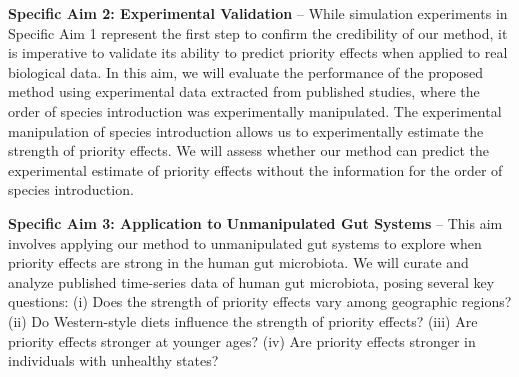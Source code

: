 \documentclass[12pt, class=article, crop=false]{standalone}
\begin{document}
\textbf{Specific Aim 2: Experimental Validation} --
While simulation experiments in Specific Aim 1 represent the first step to confirm the credibility of our method, it is imperative to validate its ability to predict priority effects when applied to real biological data.
In this aim, we will evaluate the performance of the proposed method using experimental data extracted from published studies, where the order of species introduction was experimentally manipulated.
The experimental manipulation of species introduction allows us to experimentally estimate the strength of priority effects.
We will assess whether our method can predict the experimental estimate of priority effects without the information for the order of species introduction.

\textbf{Specific Aim 3: Application to Unmanipulated Gut Systems} --
This aim involves applying our method to unmanipulated gut systems to explore when priority effects are strong in the human gut microbiota.
We will curate and analyze published time-series data of human gut microbiota, posing several key questions:
(i) Does the strength of priority effects vary among geographic regions?
(ii) Do Western-style diets influence the strength of priority effects?
(iii) Are priority effects stronger at younger ages?
(iv) Are priority effects stronger in individuals with unhealthy states?
\end{document}
